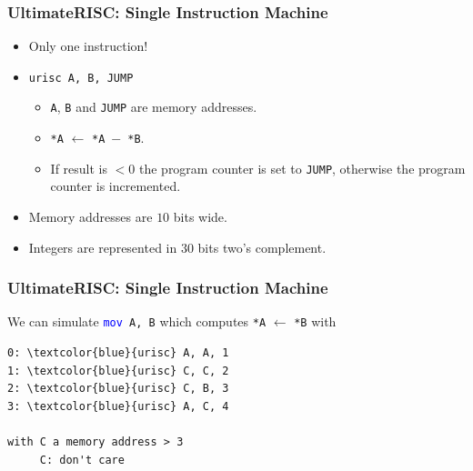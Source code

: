 \documentclass{beamer}
\newcounter{exo}
\newcommand{\exo}{
  \addtocounter{exo}{1}
  Exercice \arabic{exo}
}
\begin{document}
\begin{frame}%
\frametitle{UltimateRISC: Single Instruction Machine}

\begin{itemize}

\item Only one instruction!

\vspace{0.35cm}

\item \texttt{urisc A, B, JUMP}
  \begin{itemize}
  \item \texttt{A}, \texttt{B} and \texttt{JUMP} are memory addresses.
  \item \texttt{*A} $\leftarrow$ \texttt{*A}\ $-$\ \texttt{*B}.
  \item If result is $<0$ the program counter is set to \texttt{JUMP}, otherwise the
    program counter is incremented.
  \end{itemize}

  \vspace{0.35cm}

\item Memory addresses are $10$ bits wide.

  \vspace{0.35cm}

\item Integers are represented in $30$ bits two's complement.
\end{itemize}

\end{frame}

\begin{frame}[fragile]
\frametitle{UltimateRISC: Single Instruction Machine}

We can simulate \texttt{\textcolor{blue}{mov} A, B} which computes \texttt{*A} $\leftarrow$ \texttt{*B} with\\

\begin{Verbatim}[commandchars=\\\{\}]
0: \textcolor{blue}{urisc} A, A, 1
1: \textcolor{blue}{urisc} C, C, 2
2: \textcolor{blue}{urisc} C, B, 3
3: \textcolor{blue}{urisc} A, C, 4

with C a memory address > 3
     C: don't care
\end{Verbatim}

\end{frame}

\end{document}
